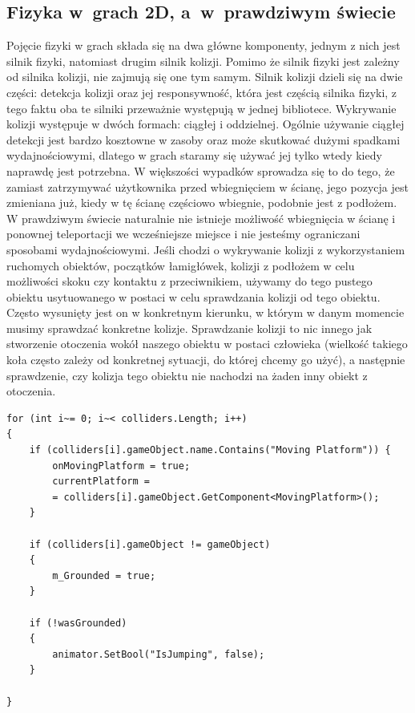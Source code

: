 \documentclass[oneside,polski,logo]{amuthesis}
\begin{document}
\subsection{Fizyka w~grach 2D, a~w~prawdziwym świecie}
Pojęcie fizyki w grach składa się na dwa główne komponenty, jednym z nich jest silnik fizyki, natomiast drugim silnik kolizji. Pomimo że silnik fizyki jest zależny od silnika kolizji, nie zajmują się one tym samym.
Silnik kolizji dzieli się na dwie części: detekcja kolizji oraz jej responsywność, która jest częścią silnika fizyki, z tego faktu oba te silniki przeważnie występują w jednej bibliotece. Wykrywanie kolizji występuje w dwóch formach: ciągłej i oddzielnej. Ogólnie używanie ciągłej detekcji jest bardzo kosztowne w zasoby oraz może skutkować dużymi spadkami wydajnościowymi, dlatego w grach staramy się używać jej tylko wtedy kiedy naprawdę jest potrzebna. W większości wypadków sprowadza się to do tego, że zamiast zatrzymywać użytkownika przed wbiegnięciem w ścianę, jego pozycja jest zmieniana już, kiedy w tę ścianę częściowo wbiegnie, podobnie jest z podłożem. W prawdziwym świecie naturalnie nie istnieje możliwość wbiegnięcia w ścianę i ponownej teleportacji we wcześniejsze miejsce i nie jesteśmy ograniczani sposobami wydajnościowymi. Jeśli chodzi o wykrywanie kolizji z wykorzystaniem ruchomych obiektów, początków łamigłówek, kolizji z podłożem w celu możliwości skoku czy kontaktu z przeciwnikiem, używamy do tego pustego obiektu usytuowanego w postaci w celu sprawdzania kolizji od tego obiektu. Często wysunięty jest on w konkretnym kierunku, w którym w danym momencie musimy sprawdzać konkretne kolizje. Sprawdzanie kolizji to nic innego jak stworzenie otoczenia wokół naszego obiektu w postaci człowieka (wielkość takiego koła często zależy od konkretnej sytuacji, do której chcemy go użyć), a następnie sprawdzenie, czy kolizja tego obiektu nie nachodzi na żaden inny obiekt z otoczenia. \cite{physics1}


\begin{lstlisting}[breaklines=true,
language={[Sharp]C},
rulecolor=\color{blue!80!black},
caption={Fragment klasy \texttt{CharacterController.cs}}
]
for (int i~= 0; i~< colliders.Length; i++)
{
	if (colliders[i].gameObject.name.Contains("Moving Platform")) {
		onMovingPlatform = true;
		currentPlatform = 
		= colliders[i].gameObject.GetComponent<MovingPlatform>();
	}

	if (colliders[i].gameObject != gameObject)
	{
		m_Grounded = true;
	}

	if (!wasGrounded)
	{
		animator.SetBool("IsJumping", false);
	}

}
\end{lstlisting}
\end{document}
